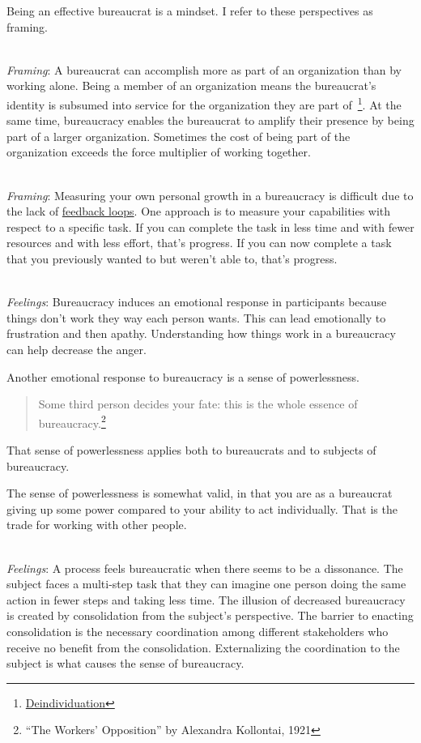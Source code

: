 Being an effective bureaucrat is a mindset. I refer to these perspectives as framing. 

\ \\
\textit{Framing}: A bureaucrat can accomplish more as part of an organization than by working alone. Being a member of an organization means the bureaucrat's identity is subsumed into service for the organization they are part of~\footnote{\href{https://en.wikipedia.org/wiki/Deindividuation}{Deindividuation}}. At the same time, bureaucracy enables the bureaucrat to amplify their presence by being part of a larger organization.  Sometimes the cost of being part of the organization exceeds the force multiplier of working together. 

\ \\
\textit{Framing}: Measuring your own personal growth in a bureaucracy is difficult due to the lack of \hyperref[sec:feedback-loop-and-ripples]{feedback loops}. One approach is to measure your capabilities with respect to a specific task. If you can complete the task in less time and with fewer resources and with less effort, that's progress. If you can now complete a task that you previously wanted to but weren't able to, that's progress.


\ \\
\textit{Feelings}: Bureaucracy induces an emotional response in participants because things don't work they way each person wants. This can lead emotionally to frustration and then apathy. Understanding how things work in a bureaucracy can help decrease the anger.


Another emotional response to bureaucracy is a sense of powerlessness. 
\begin{quote}
Some third person decides your fate: this is the whole essence of bureaucracy.\footnote{``The Workers' Opposition'' by Alexandra Kollontai, 1921}
\end{quote}
That sense of powerlessness applies both to bureaucrats and to subjects of bureaucracy. 

The sense of powerlessness is somewhat valid, in that you are as a bureaucrat giving up some power compared to your ability to act individually. That is the trade for working with other people.

\ \\
\textit{Feelings}: A process feels bureaucratic when there seems to be a dissonance. The subject faces a multi-step task that they can imagine one person doing the same action in fewer steps and taking less time. The illusion of decreased bureaucracy is created by consolidation from the subject's perspective. The barrier to enacting consolidation is the necessary coordination among different stakeholders who receive no benefit from the consolidation. Externalizing the coordination to the subject is what causes the sense of bureaucracy. 

